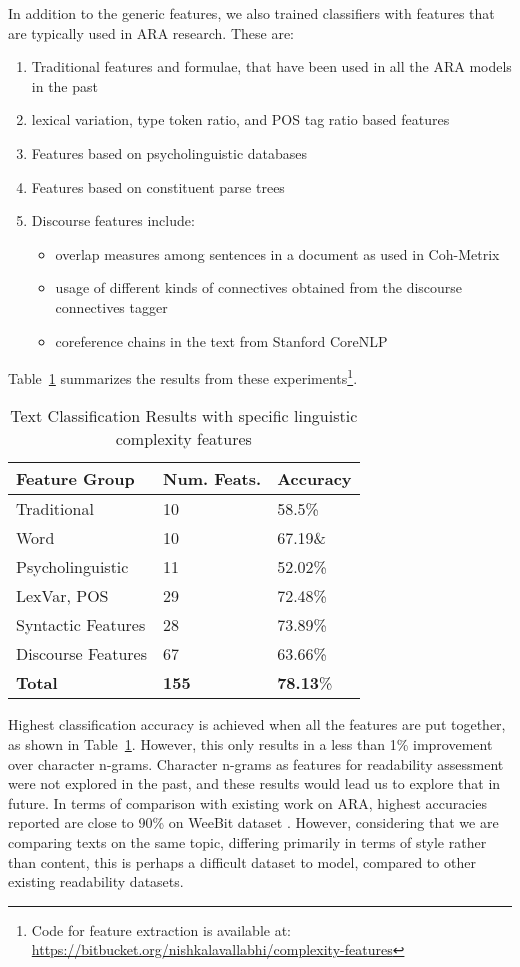 \documentclass[11pt,a4paper]{article}
\begin{document}
In addition to the generic features, we also trained classifiers with features that are typically used in ARA research. These are:
\begin{enumerate}
\item Traditional features and formulae, that have been used in all the ARA models in the past 
\item lexical variation, type token ratio, and POS tag ratio based features
\item Features based on psycholinguistic databases
\item Features based on constituent parse trees 
\item Discourse features include:
\begin{itemize} 
\item overlap measures among sentences in a document as used in Coh-Metrix \cite{Graesser.McNamara.ea-14}
\item usage of different kinds of connectives obtained from the discourse connectives tagger \cite{Pitler.Nenkova-09} 
\item coreference chains in the text from Stanford CoreNLP
\end{itemize}
\end{enumerate}
Table~\ref{tab:araresults2} summarizes the results from these experiments\footnote{Code for feature extraction is available at: \url{https://bitbucket.org/nishkalavallabhi/complexity-features}}.

\begin{table}[h!]
\begin{tabular}{|l|l|l|}
\hline Feature Group & Num. Feats. & Accuracy \\
\hline Traditional & 10& 58.5\%\\
\hline Word  & 10 & 67.19\&\\
\hline Psycholinguistic & 11 & 52.02\% \\
\hline LexVar, POS & 29 & 72.48\%\\
\hline Syntactic Features & 28 & 73.89\%\\
\hline Discourse Features & 67 &63.66\%\\
\hline \textbf {Total} & \textbf {155}&\textbf {78.13}\% \\
\hline
\end{tabular}
\caption{Text Classification Results with specific linguistic complexity features}
\label{tab:araresults2}
\end{table}
Highest classification accuracy is achieved when all the features are put together, as shown in Table~\ref{tab:araresults2}. However, this only results in a less than 1\% improvement over character n-grams. Character n-grams as features for readability assessment were not explored in the past, and these results would lead us to explore that in future. In terms of comparison with existing work on ARA, highest accuracies reported are close to 90\% on WeeBit dataset \cite{Vajjala.Meurers-12}. However, considering that we are comparing texts on the same topic, differing primarily in terms of style rather than content, this is perhaps a difficult dataset to model, compared to other existing readability datasets. 
\end{document}
